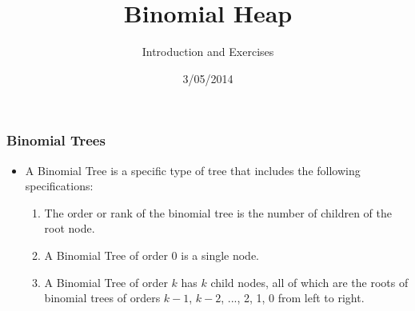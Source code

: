 \documentclass[13pt]{beamer}
\title{Binomial Heap}
\author{Introduction and Exercises}
\institute{Devin Delfino}
\date{3/05/2014}
\begin{document}
\frame{\titlepage}

\begin{frame}
\frametitle{Binomial Trees}
	\begin{itemize}
		\item A \alert{Binomial Tree} is a specific type of tree that includes the following specifications:
          \begin{enumerate}
            \item The \alert{order} or \alert{rank} of the binomial tree is the number of children of the root node.
            \item A Binomial Tree of order $0$ is a single node.
            \item A Binomial Tree of order $k$ has $k$ child nodes, all of which are the roots of binomial trees of orders $k - 1$, $k - 2$, ..., 2, 1, 0 from left to right.
          \end{enumerate}
	\end{itemize}
\end{frame}
\end{document}
